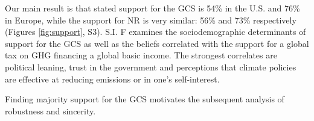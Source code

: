 Our main result is that stated support for the GCS is 54\% in the U.S. and 76\% in Europe, while the support for NR is very similar: 56\% and 73\% respectively (Figures \ref{fig:support}, S3). %
S.I. F 
examines the sociodemographic determinants of support for the GCS as well as the beliefs correlated with the support for a global tax on GHG financing a global basic income. The strongest correlates are political leaning, trust in the government and perceptions that climate policies are effective at reducing emissions or in one's self-interest. 

Finding majority support for the GCS %
motivates the subsequent analysis of robustness and sincerity. %


